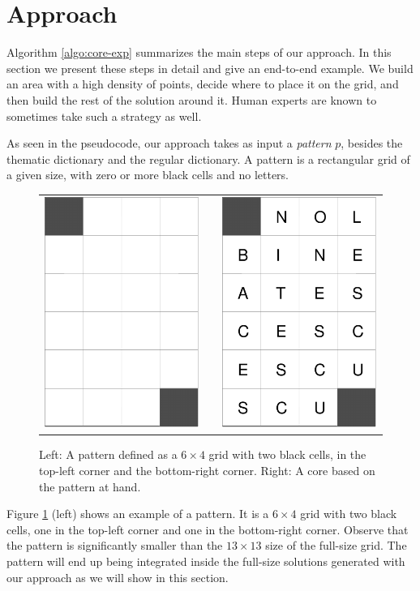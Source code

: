 \section{Approach}

Algorithm \ref{algo:core-exp} summarizes the main steps of our approach.
In this section we present these steps in detail and give an end-to-end example.
We build an area with a high density of points, decide where to place it on the grid,
and then build the rest of the solution around it.
Human experts are known to sometimes take such a strategy as well.

As seen in the pseudocode, our approach takes as input a \emph{pattern} $p$, besides
the thematic dictionary and the regular dictionary.
A {pattern} is a rectangular grid of a given size, with zero or more black cells and no letters.

\begin{figure}
\centering
\begin{tabular}{ccc}
\includegraphics[width=.15\textwidth]{_plots/6x4-puzzle.pdf} & &
\includegraphics[width=.15\textwidth]{_plots/core-6x4-puzzle.pdf}
\end{tabular}
\caption{Left: A pattern defined as a $6 \times 4$ grid with two black cells, in the top-left corner and the bottom-right corner. Right: A core based on the pattern at hand.}
\label{fig:pattern}
\end{figure}

Figure \ref{fig:pattern} (left) shows an example of a pattern. It is a $6 \times 4$ grid with two black cells, one in the top-left corner and one in the bottom-right corner.
Observe that the pattern is significantly smaller than the $13 \times 13$ size of the full-size grid.
The pattern will end up being integrated inside the full-size solutions generated with our approach
as we will show in this section.

